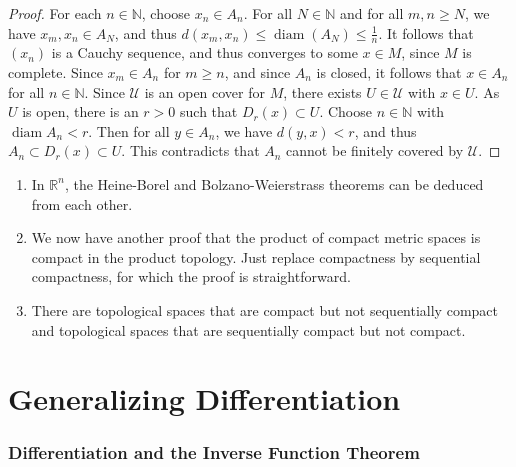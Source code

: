 \documentclass[a4paper]{article}
\begin{document}
\begin{proof}
For each $n \in \mathbb{N}$, choose $x_{n} \in A_{n}$. For all $N \in \mathbb{N}$ and for all $m, n \geqslant N$, we have $x_{m}, x_{n} \in A_{N}$, and thus $d\left(x_{m}, x_{n}\right) \leqslant \operatorname{diam}\left(A_{N}\right)\le\frac{1}{n}$. It follows that $\left(x_{n}\right)$ is a Cauchy sequence, and thus converges to some $x \in M$, since $M$ is complete. Since $x_{m} \in A_{n}$ for $m \geqslant n$, and since $A_{n}$ is closed, it follows that $x \in A_{n}$ for all $n \in \mathbb{N}$. Since $\mathcal{U}$ is an open cover for $M$, there exists $U \in \mathcal{U}$ with $x \in U$. As $U$ is open, there is an $r>0$ such that $D_{r}(x) \subset U$. Choose $n \in \mathbb{N}$ with $\operatorname{diam} A_{n}<r$. Then for all $y \in A_{n}$, we have $d(y, x)<r$, and thus $A_{n} \subset D_{r}(x) \subset U$. This contradicts that $A_{n}$ cannot be finitely covered by $\mathcal{U}$.
\end{proof}

\begin{remark}
    \begin{enumerate}
        \item In $\mathbb{R}^{n}$, the Heine-Borel and Bolzano-Weierstrass theorems can be deduced from each other.
      
        \item We now have another proof that the product of compact metric spaces is compact in the product topology. Just replace compactness by sequential compactness, for which the proof is straightforward.
      
        \item There are topological spaces that are compact but not sequentially compact and topological spaces that are sequentially compact but not compact.
      
      \end{enumerate}
\end{remark}

\clearpage
\part{Generalizing Differentiation}

\section{Differentiation and the Inverse Function Theorem}
\end{document}
